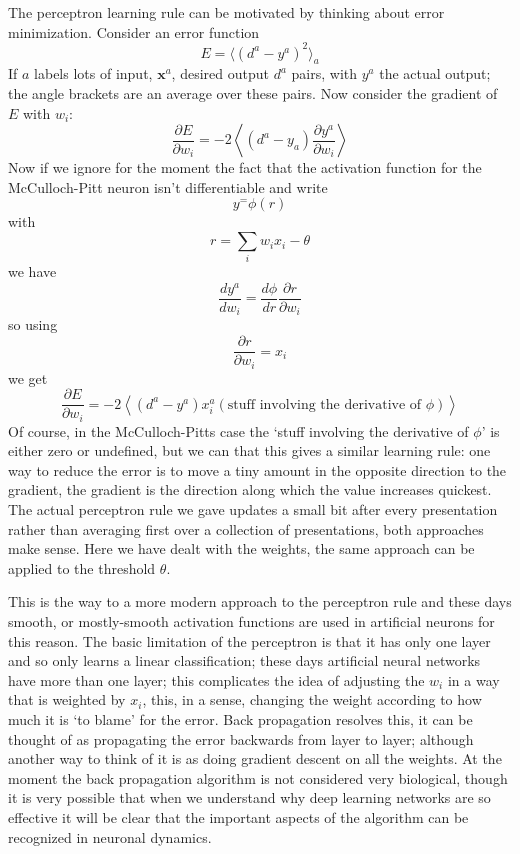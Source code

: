 \documentclass[12pt]{article}
\begin{document}
The perceptron learning rule can be motivated by thinking about error
minimization. Consider an error function
\begin{equation}
E=\langle(d^a-y^a)^2\rangle_a
\end{equation}
If $a$ labels lots of input, $\textbf{x}^a$, desired output $d^a$
pairs, with $y^a$ the actual output; the angle brackets are an average
over these pairs. Now consider the gradient of $E$ with $w_{i}$:
\begin{equation}
\frac{\partial E}{\partial w_{i}}=-2\left\langle (d^a-y_a) \frac{\partial y^a}{\partial w_{i}}\right\rangle
\end{equation}
Now if we ignore for the moment the fact that the activation function for the McCulloch-Pitt neuron isn't differentiable and write
\begin{equation}
y^=\phi(r)
\end{equation}
with 
\begin{equation}
r=\sum_{i}w_i x_i-\theta
\end{equation}
we have
\begin{equation}
\frac{dy^a}{dw_i}=\frac{d\phi}{dr}\frac{\partial r}{\partial w_i}
\end{equation}
so using
\begin{equation}
\frac{\partial r}{\partial w_i}=x_i
\end{equation}
we get
\begin{equation}
\frac{\partial E}{\partial w_{i}}=-2\left\langle (d^a-y^a)x^a_i (\mbox{stuff involving the derivative of }\phi)\right\rangle
\end{equation}
Of course, in the McCulloch-Pitts case the \lq{}stuff involving the
derivative of $\phi$\rq{} is either zero or undefined, but we can that
this gives a similar learning rule: one way to reduce the error is to
move a tiny amount in the opposite direction to the gradient, the
gradient is the direction along which the value increases
quickest. The actual perceptron rule we gave updates a small bit after
every presentation rather than averaging first over a collection of
presentations, both approaches make sense. Here we have dealt with the
weights, the same approach can be applied to the threshold $\theta$.

This is the way to a more modern approach to the perceptron rule and
these days smooth, or mostly-smooth activation functions are used in
artificial neurons for this reason. The basic limitation of the
perceptron is that it has only one layer and so only learns a linear
classification; these days artificial neural networks have more than
one layer; this complicates the idea of adjusting the $w_i$ in a way
that is weighted by $x_i$, this, in a sense, changing the weight
according to how much it is \lq{}to blame\rq{} for the error. Back
propagation resolves this, it can be thought of as propagating the
error backwards from layer to layer; although another way to think of
it is as doing gradient descent on all the weights. At the moment the
back propagation algorithm is not considered very biological, though
it is very possible that when we understand why deep learning networks
are so effective it will be clear that the important aspects of the
algorithm can be recognized in neuronal dynamics.
\end{document}
